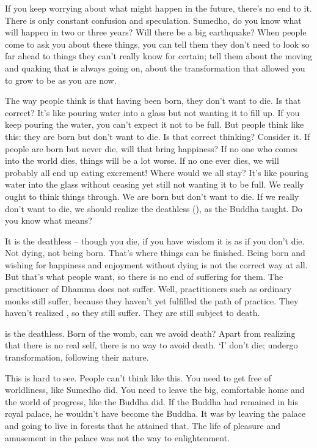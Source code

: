 If you keep worrying about what might happen in the future, there's no end to it. There is only constant confusion and speculation. Sumedho, do you know what will happen in two or three years? Will there be a big earthquake? When people come to ask you about these things, you can tell them they don't need to look so far ahead to things they can't really know for certain; tell them about the moving and quaking that is always going on, about the transformation that allowed you to grow to be as you are now.

The way people think is that having been born, they don't want to die. Is that correct? It's like pouring water into a glass but not wanting it to fill up. If you keep pouring the water, you can't expect it not to be full. But people think like this: they are born but don't want to die. Is that correct thinking? Consider it. If people are born but never die, will that bring happiness? If no one who comes into the world dies, things will be a lot worse. If no one ever dies, we will probably all end up eating excrement! Where would we all stay? It's like pouring water into the glass without ceasing yet still not wanting it to be full. We really ought to think things through. We are born but don't want to die. If we really don't want to die, we should realize the deathless (), as the Buddha taught. Do you know what  means?

It is the deathless -- though you die, if you have wisdom it is as if you don't die. Not dying, not being born. That's where things can be finished. Being born and wishing for happiness and enjoyment without dying is not the correct way at all. But that's what people want, so there is no end of suffering for them. The practitioner of Dhamma does not suffer. Well, practitioners such as ordinary monks still suffer, because they haven't yet fulfilled the path of practice. They haven't realized , so they still suffer. They are still subject to death.

 is the deathless. Born of the womb, can we avoid death? Apart from realizing that there is no real self, there is no way to avoid death. `I' don't die;  undergo transformation, following their nature. 

This is hard to see. People can't think like this. You need to get free of worldliness, like Sumedho did. You need to leave the big, comfortable home and the world of progress, like the Buddha did. If the Buddha had remained in his royal palace, he wouldn't have become the Buddha. It was by leaving the palace and going to live in forests that he attained that. The life of pleasure and amusement in the palace was not the way to enlightenment.

